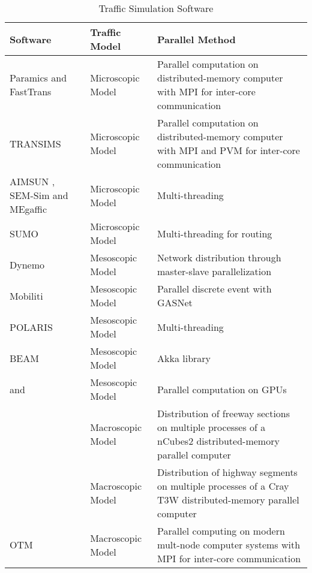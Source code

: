 \begin{table*}[htbp]
\centering
\begin{tabular} { | l | p{25mm} | p{80mm}| } 
	\hline
	\hline
	\textbf{Software} & \textbf{Traffic Model} & \textbf{Parallel Method}\\ \hline
	Paramics \cite{cameron1996paramics} and FastTrans \cite{thulasidasan2009accelerating}    & Microscopic Model & Parallel computation on distributed-memory computer with MPI for inter-core communication \\ \hline
	TRANSIMS \cite{robertson1969transyt}     & Microscopic Model & Parallel computation on distributed-memory computer with MPI and PVM for inter-core communication \\ \hline
	AIMSUN \cite{ferrer1993aimsun2}, SEM-Sim \cite{aydt2013multi} and MEgaffic \cite{osogami2012research}     & Microscopic Model & Multi-threading \\ \hline
	SUMO \cite{behrisch2011sumo}    & Microscopic Model & Multi-threading for routing \\ \hline
	Dynemo \cite{nokel2002parallel}  & Mesoscopic Model & Network distribution through master-slave parallelization \\ \hline
	Mobiliti \cite{chan2018mobiliti}     & Mesoscopic Model & Parallel discrete event with GASNet \\ \hline
	POLARIS \cite{auld2016polaris}     & Mesoscopic Model & Multi-threading \\ \hline
	BEAM \cite{aboutBeam}    & Mesoscopic Model & Akka library \\ \hline
	\cite{xu2014mesoscopic,song2017supporting}and \cite{strippgen2009multi}     & Mesoscopic Model & Parallel computation on GPUs \\ \hline
	\cite{chronopoulos1998real}     & Macroscopic Model & Distribution of freeway sections on multiple processes of a nCubes2 distributed-memory parallel computer \\ \hline
	\cite{johnston1999parallelization}     & Macroscopic Model & Distribution of highway segments on multiple processes of a Cray T3W distributed-memory parallel computer \\ \hline
	OTM & Macroscopic Model & Parallel computing on modern mult-node computer systems with MPI for inter-core communication\\ \hline
\end{tabular}
\caption{Traffic Simulation Software}
\label{tab:softwares}
\end{table*}

